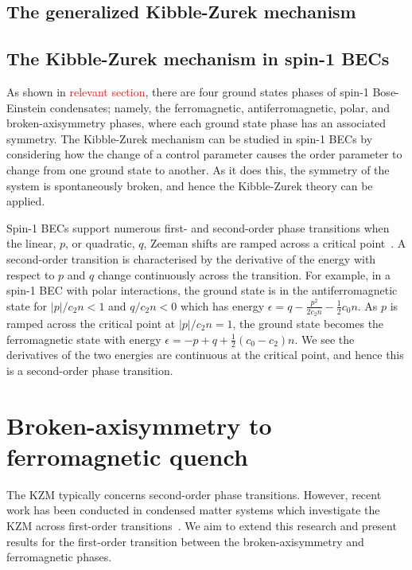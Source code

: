 \subsection{The generalized Kibble-Zurek mechanism}

\subsection{The Kibble-Zurek mechanism in spin-1 BECs}
As shown in \textcolor{red}{relevant section}, there are four ground states
phases of spin-1 Bose-Einstein condensates; namely, the ferromagnetic,
antiferromagnetic, polar, and broken-axisymmetry phases, where each ground
state phase has an associated symmetry.
The Kibble-Zurek mechanism can be studied in spin-1 BECs by considering how
the change of a control parameter causes the order parameter to change from 
one ground state to another.
As it does this, the symmetry of the system is spontaneously broken, and hence
the Kibble-Zurek theory can be applied.

Spin-1 BECs support numerous first- and second-order phase transitions
when the linear, $p$, or quadratic, $q$, Zeeman shifts are
ramped across a critical point~\cite{Kawaguchi2012}.
A second-order transition is characterised by the derivative of the energy with
respect to $p$ and $q$ change continuously across the transition.
For example, in a spin-1 BEC with polar interactions, the ground state is in
the antiferromagnetic state for $|p|/c_2n<1$ and $q/c_2n<0$ which has energy
$\epsilon = q - \frac{p^2}{2c_2n}-\frac{1}{2}c_0n$.
As $p$ is ramped across the critical point at $|p|/c_2n=1$, the ground state
becomes the ferromagnetic state with energy
$\epsilon = -p + q + \frac{1}{2}(c_0 - c_2)n$.
We see the derivatives of the two energies are continuous at the critical point,
and hence this is a second-order phase transition.

\section{Broken-axisymmetry to ferromagnetic quench}
The KZM typically concerns second-order phase transitions. However, recent
work has been conducted in condensed matter systems which investigate
the KZM across first-order transitions~\cite{Qiu2020}.
We aim to extend this research and present results for
the first-order transition between the broken-axisymmetry and
ferromagnetic phases.

